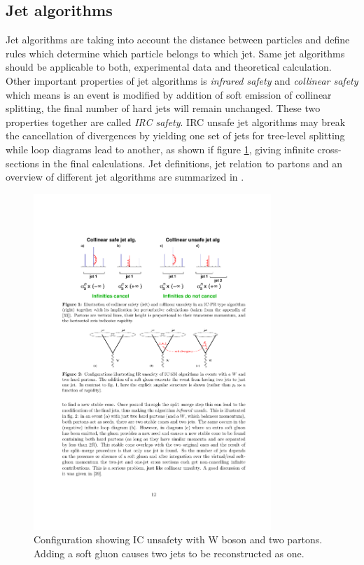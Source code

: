 
\subsection{Jet algorithms}

Jet algorithms are taking into account the distance between particles and define rules which determine which particle belongs to which jet. Same jet algorithms should be applicable to both, experimental data and theoretical calculation.  Other important properties of jet algorithms is \textit{infrared safety} and \textit{collinear safety} which means is an event is modified by addition of soft emission of collinear splitting, the final number of hard jets will remain unchanged. These two properties together are called \textit{IRC safety}. IRC unsafe jet algorithms may break the cancellation of divergences by yielding one set of jets for tree-level splitting while loop diagrams lead to another, as shown if figure \ref{fig:jet_unsafe}, giving infinite cross-sections in the final calculations. Jet definitions, jet relation to partons and an overview of different jet algorithms are summarized in \cite{Salam:2009jx}.
\begin{figure}[htbp]
	\centering
		\includegraphics[width=0.8\textwidth]{Figures/jet_unsafe2.pdf}
	\caption[An example of configuration of IRC unsafe jet algorithm.]{Configuration showing IC  unsafety with W boson and two partons. Adding a soft gluon causes two jets to be reconstructed as one. \cite{Salam:2009jx}}
	\label{fig:jet_unsafe}
\end{figure}

